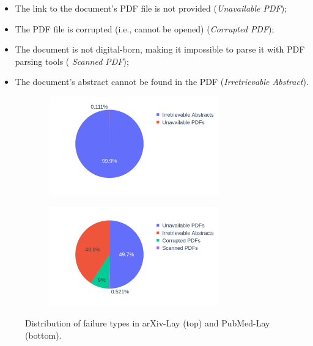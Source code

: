 \begin{itemize}
    \item The link to the document's PDF file is not provided (\textit{Unavailable PDF});
    \item The PDF file is corrupted (i.e., cannot be opened) (\textit{Corrupted PDF});
    \item The document is not digital-born, making it impossible to parse it with PDF parsing tools (\textit{ Scanned PDF});
    \item The document's abstract cannot be found in the PDF (\textit{Irretrievable Abstract}).
\end{itemize}

\begin{figure}[H]
    \centering
  \begin{subfigure}[b]{0.4\textwidth}
    \includegraphics[width=0.8\textwidth]{images/chapter5/distribution_failure_types_arxiv.pdf}
  \end{subfigure}
  \begin{subfigure}[b]{0.4\textwidth}
    \includegraphics[width=0.8\textwidth]{images/chapter5/distribution_failure_types_pubmed.pdf}
  \end{subfigure}
\caption{Distribution of failure types in arXiv-Lay (top) and PubMed-Lay (bottom).}
\label{fig:chapter5-details-lost-docs}
\end{figure}


